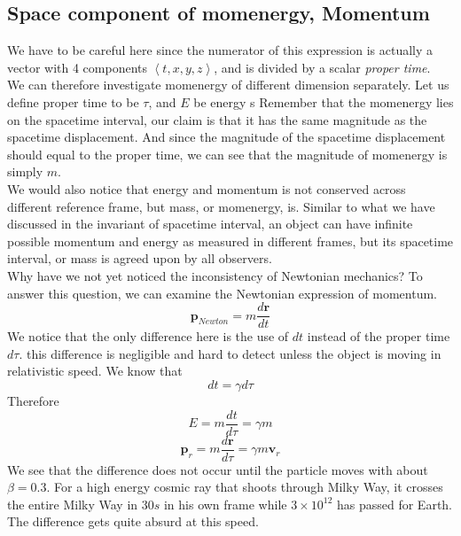 \documentclass[12pt]{book}
\newcommand{\dydx}[2]{\frac{d #1}{d #2}}
\newcommand{\tribkt}[1]{\left< #1 \right>}
\begin{document}
\subsection{Space component of momenergy, Momentum}
We have to be careful here since the numerator of this expression is actually a vector with 4 components $\tribkt{t,x,y,z}$, and is divided by a scalar \textit{proper time}.\\
\newline
We can therefore investigate momenergy of different dimension separately. Let us define proper time to be $\tau$, and $E$ be energy
s
Remember that the momenergy lies on the spacetime interval, our claim is that it has the same magnitude as the spacetime displacement. And since the magnitude of the spacetime displacement should equal to the proper time, we can see that the magnitude of momenergy is simply $\textit{m}$.
\\
\newline
We would also notice that energy and momentum is not conserved across different reference frame, but mass, or momenergy, is. Similar to what we have discussed in the invariant of spacetime interval, an object can have infinite possible momentum and energy as measured in different frames, but its spacetime interval, or mass is agreed upon by all observers. \\
\newline
Why have we not yet noticed the inconsistency of Newtonian mechanics? To answer this question, we can examine the Newtonian expression of momentum. 
\[
\textbf{p}_{Newton} = m\dydx{\textbf{r}}{t}
\]
We notice that the only difference here is the use of $dt$ instead of the proper time $d\tau$. this difference is negligible and hard to detect unless the object is moving in relativistic speed. We know that 
\[
dt = \gamma d\tau
\]
Therefore 
\[
E = m \dydx{t}{\tau} = \gamma m
\]
\[
\textbf{p}_r = m\dydx{\textbf{r}}{\tau} = \gamma m\textbf{v}_r
\]
We see that the difference does not occur until the particle moves with about $\beta=0.3$. For a high energy cosmic ray that shoots through Milky Way, it crosses the entire Milky Way in $30s$ in his own frame while $3\times 10^{12}$ has passed for Earth. The difference gets quite absurd at this speed. 
\end{document}
